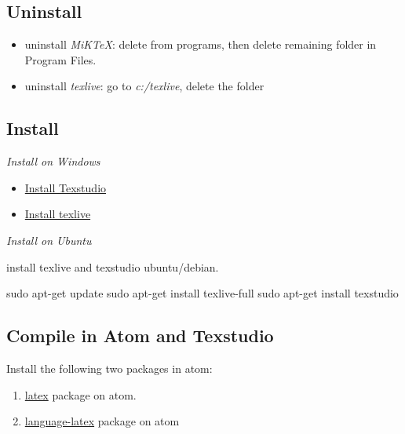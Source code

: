 \documentclass[]{article}
\newenvironment{Shaded}{\begin{snugshade}}{\end{snugshade}}
\newcommand{\FunctionTok}[1]{\textcolor[rgb]{0.00,0.00,0.00}{#1}}
\newcommand{\NormalTok}[1]{#1}
\providecommand{\tightlist}{%
  \setlength{\itemsep}{0pt}\setlength{\parskip}{0pt}}
\begin{document}
\hypertarget{uninstall}{%
\subsection{Uninstall}\label{uninstall}}

\begin{itemize}
\tightlist
\item
  uninstall \emph{MiKTeX}: delete from programs, then delete remaining
  folder in Program Files.
\item
  uninstall \emph{texlive}: go to \emph{c:/texlive}, delete the folder
\end{itemize}

\hypertarget{install}{%
\subsection{Install}\label{install}}

\emph{Install on Windows}

\begin{itemize}
\tightlist
\item
  \href{https://www.texstudio.org/}{Install Texstudio}
\item
  \href{https://www.tug.org/texlive/acquire-netinstall.html}{Install
  texlive}
\end{itemize}

\emph{Install on Ubuntu}

install texlive and texstudio ubuntu/debian.

\begin{Shaded}
\begin{Highlighting}[]
\FunctionTok{sudo}\NormalTok{ apt-get update}
\FunctionTok{sudo}\NormalTok{ apt-get install texlive-full}
\FunctionTok{sudo}\NormalTok{ apt-get install texstudio}
\end{Highlighting}
\end{Shaded}

\hypertarget{compile-in-atom-and-texstudio}{%
\subsection{Compile in Atom and
Texstudio}\label{compile-in-atom-and-texstudio}}

Install the following two packages in atom:

\begin{enumerate}
\def\labelenumi{\arabic{enumi}.}
\tightlist
\item
  \href{https://github.com/thomasjo/atom-latex}{latex} package on atom.
\item
  \href{https://atom.io/packages/language-latex}{language-latex} package
  on atom
\end{enumerate}
\end{document}
